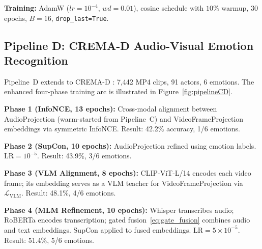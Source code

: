 \documentclass[10pt,conference]{IEEEtran}
\theoremstyle{ieeethm}
\theoremstyle{ieeedef}
\theoremstyle{ieeeremark}
\begin{document}
\textbf{Training:} AdamW ($lr{=}10^{-4}$, $wd{=}0.01$), cosine schedule with $10\%$ warmup, 30 epochs, $B{=}16$, \texttt{drop\_last=True}.

\subsection{Pipeline D: CREMA-D Audio-Visual Emotion Recognition}

Pipeline~D extends to CREMA-D \cite{cao2014crema}: 7,442 MP4 clips, 91 actors, 6 emotions. The enhanced four-phase training arc is illustrated in Figure~\ref{fig:pipelineCD}.

\textbf{Phase 1 (InfoNCE, 13 epochs):} Cross-modal alignment between AudioProjection (warm-started from Pipeline~C) and VideoFrameProjection embeddings via symmetric InfoNCE. Result: 42.2\% accuracy, 1/6 emotions.

\textbf{Phase 2 (SupCon, 10 epochs):} AudioProjection refined using emotion labels. LR$=10^{-5}$. Result: 43.9\%, 3/6 emotions.

\textbf{Phase 3 (VLM Alignment, 8 epochs):} CLIP-ViT-L/14 encodes each video frame; its embedding serves as a VLM teacher for VideoFrameProjection via $\mathcal{L}_\text{VLM}$. Result: 48.1\%, 4/6 emotions.

\textbf{Phase 4 (MLM Refinement, 10 epochs):} Whisper transcribes audio; RoBERTa encodes transcription; gated fusion~\eqref{eq:gate_fusion} combines audio and text embeddings. SupCon applied to fused embeddings. LR$=5{\times}10^{-5}$. Result: 51.4\%, 5/6 emotions.
\end{document}
